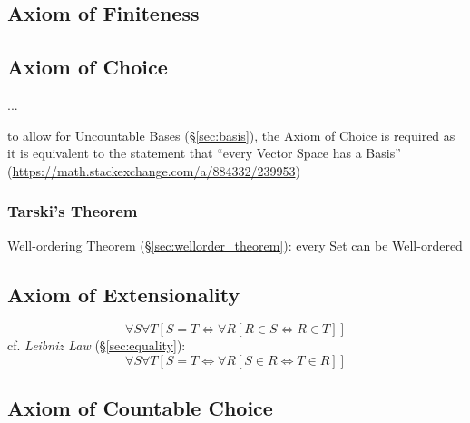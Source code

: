 \subsection{Axiom of Finiteness}\label{sec:finiteness_axiom}

\subsection{Axiom of Choice}\label{sec:choice_axiom}

...

\fist to allow for Uncountable Bases (\S\ref{sec:basis}), the Axiom of Choice is
required as it is equivalent to the statement that ``every Vector Space has a
Basis'' (\url{https://math.stackexchange.com/a/884332/239953})



\subsubsection{Tarski's Theorem}\label{sec:tarskis_theorem}

Well-ordering Theorem (\S\ref{sec:wellorder_theorem}): every Set can
be Well-ordered



\subsection{Axiom of Extensionality}\label{sec:extensionality_axiom}

\[
  \forall S \forall T
    [S = T \Leftrightarrow \forall R [ R \in S \Leftrightarrow R \in T ]]
\]
cf. \emph{Leibniz Law} (\S\ref{sec:equality}):
\[
  \forall S \forall T
    [S = T \Leftrightarrow \forall R [ S \in R \Leftrightarrow T \in R ]]
\]


\subsection{Axiom of Countable Choice}\label{sec:countable_choice}

